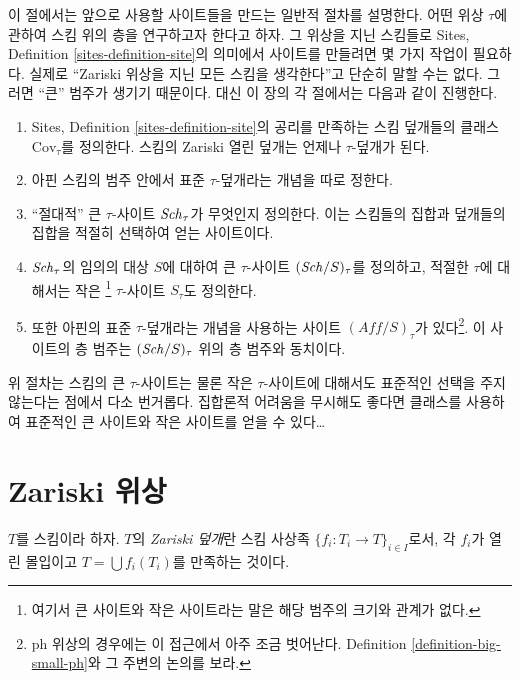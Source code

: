 \noindent
이 절에서는 앞으로 사용할 사이트들을 만드는 일반적 절차를 설명한다.
어떤 위상 $\tau$에 관하여 스킴 위의 층을 연구하고자 한다고 하자.
그 위상을 지닌 스킴들로 Sites, Definition \ref{sites-definition-site}의
의미에서 사이트를 만들려면 몇 가지 작업이 필요하다. 실제로
``Zariski 위상을 지닌 모든 스킴을 생각한다''고 단순히 말할 수는 없다.
그러면 ``큰'' 범주가 생기기 때문이다. 대신 이 장의 각 절에서는 다음과
같이 진행한다.
\begin{enumerate}
\item Sites, Definition \ref{sites-definition-site}의 공리를 만족하는
스킴 덮개들의 클래스 $\text{Cov}_\tau$를 정의한다. 스킴의 Zariski 열린
덮개는 언제나 $\tau$-덮개가 된다.
\item 아핀 스킴의 범주 안에서 표준 $\tau$-덮개라는 개념을 따로 정한다.
\item ``절대적'' 큰 $\tau$-사이트 $\mathit{Sch}_\tau$가 무엇인지 정의한다.
이는 스킴들의 집합과 덮개들의 집합을 적절히 선택하여 얻는 사이트이다.
\item $\mathit{Sch}_\tau$의 임의의 대상 $S$에 대하여 큰 $\tau$-사이트
$(\mathit{Sch}/S)_\tau$를 정의하고, 적절한 $\tau$에 대해서는 작은
\footnote{여기서 큰 사이트와 작은 사이트라는 말은 해당 범주의 크기와
관계가 없다.} $\tau$-사이트 $S_\tau$도 정의한다.
\item 또한 아핀의 표준 $\tau$-덮개라는 개념을 사용하는 사이트
$(\textit{Aff}/S)_\tau$가 있다\footnote{ph 위상의 경우에는 이 접근에서
아주 조금 벗어난다. Definition \ref{definition-big-small-ph}와 그 주변의
논의를 보라.}. 이 사이트의 층 범주는 $(\mathit{Sch}/S)_\tau$ 위의 층 범주와
동치이다.
\end{enumerate}
위 절차는 스킴의 큰 $\tau$-사이트는 물론 작은 $\tau$-사이트에 대해서도
표준적인 선택을 주지 않는다는 점에서 다소 번거롭다. 집합론적 어려움을
무시해도 좋다면 클래스를 사용하여 표준적인 큰 사이트와 작은 사이트를
얻을 수 있다\ldots







\section{Zariski 위상}
\label{section-zariski}

\begin{definition}
\label{definition-zariski-covering}
$T$를 스킴이라 하자. $T$의 {\it Zariski 덮개}란 스킴 사상족
$\{f_i : T_i \to T\}_{i \in I}$로서, 각 $f_i$가 열린 몰입이고
$T = \bigcup f_i(T_i)$를 만족하는 것이다.
\end{definition}

